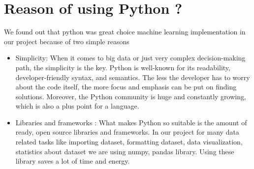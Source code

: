 \section{Reason of using  Python ?}
We found out that python was great choice machine learning implementation in our project because of two simple reasons
\begin{itemize}
\item Simplicity: When it comes to big data or just very complex decision-making path, the simplicity is the key. Python is well-known for its readability, developer-friendly syntax, and semantics. The less the developer has to worry about the code itself, the more focus and emphasis can be put on finding solutions. Moreover, the Python community is huge and constantly growing, which is also a plus point for a language.
\item Libraries and frameworks : What makes Python so suitable is the amount of ready, open source libraries and frameworks. In our project for many data related tasks like importing dataset, formatting dataset, data visualization, statistics about dataset we are using numpy, pandas library. Using these library saves a lot of time and energy.

\end{itemize}



